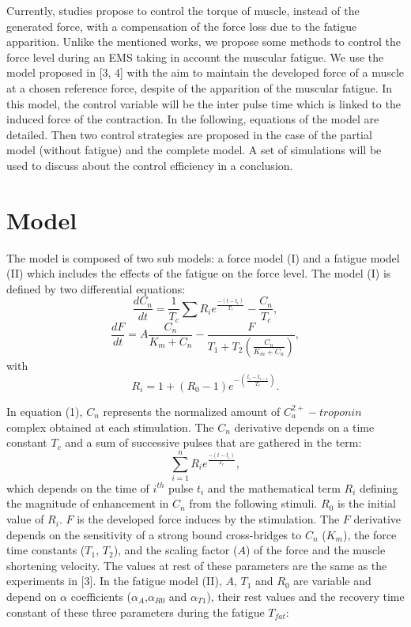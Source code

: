 \documentclass[10pt,twocolumn,letterpaper, 
]{article}
\begin{document}
Currently, studies propose to control the torque of muscle, instead of the generated force, with a compensation of the force loss due to the fatigue apparition. Unlike the mentioned works, we propose some methods to control the force level during an EMS taking in account the muscular fatigue. We use the model proposed in [3, 4] with the aim to maintain the developed force of a muscle at a chosen reference force, despite of the apparition of the muscular fatigue. In this model, the control variable will be the inter pulse time which is linked to the induced force of the contraction. 
In the following, equations of the model are detailed. Then two control strategies are proposed in the case of the partial model (without fatigue) and the complete model. A set of simulations will be used to discuss about the control efficiency in a conclusion.

\section{Model}
The model is composed of two sub models: a force model (I) and a fatigue model (II) which includes the effects of the fatigue on the force level. The model (I) is defined by two differential equations:
\begin{equation}
\frac{dC_n}{dt}=\frac{1}{T_c}\sum R_ie^{\frac{-(t-t_i)}{T_c}}-\frac{C_n}{T_c}  ,
\end{equation}
\begin{equation}
	\frac{dF}{dt}=A\frac{C_n}{K_m+C_n}-\frac{F}{T_1+T_2(\frac{C_n}{K_m+C_n})}  ,
\end{equation}
with
\begin{equation}
R_i=1+(R_0-1)e^{-(\frac{t_i-t_{i-1}}{T_c})} .
\end{equation}

In equation (1), $C_n$ represents the normalized amount of $C_a^{2+}-troponin$ complex obtained at each stimulation. The $C_n$ derivative depends on a time constant $T_c$ and a sum of successive pulses that are gathered in the term: 
\begin{equation}
\sum \limits_{{i=1}}^n  R_ie^{\frac{-(t-t_i)}{T_c}},
\end{equation}
which depends on the time of $i^{th}$ pulse $t_i$ and the mathematical term $R_i$ defining the magnitude of enhancement in $C_n$ from the following stimuli. $R_0$ is the initial value of $R_i$. 
$F$ is the developed force induces by the stimulation. The $F$ derivative depends on the sensitivity of a strong bound cross-bridges to $C_n$ ($K_m$), the force time constants ($T_1$, $T_2$), and the scaling factor ($A$) of the force and the muscle shortening velocity. The values at rest of these parameters are the same as the experiments in [3]. In the fatigue model (II), $A$, $T_1$ and $R_0$ are variable and depend on $\alpha$ coefficients ($\alpha_A$,$\alpha_{R0}$ and $\alpha_{T1}$), their rest values and the recovery time constant of these three parameters during the fatigue $T_{fat}$:
 
\end{document}
